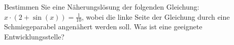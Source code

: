 \item
Bestimmen Sie eine Näherungslösung der folgenden Gleichung:
$x\cdot(2+\sin(x))=\frac{1}{10}$, wobei die linke Seite der Gleichung durch eine Schmiegeparabel angenähert werden soll. Was ist eine geeignete Entwicklungsstelle?\


